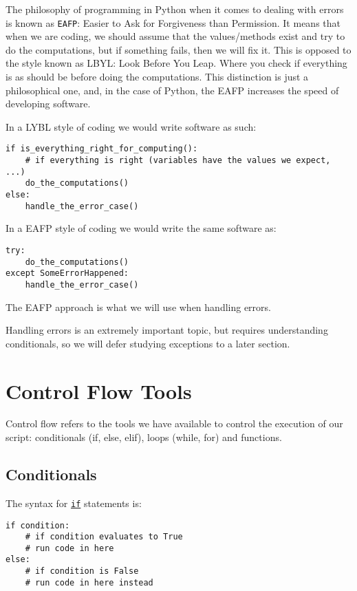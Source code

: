 \documentclass[12pt, a4paper]{article}
\begin{document}
The philosophy of programming in Python when it comes to dealing with errors is known as \texttt{EAFP}: Easier to Ask for Forgiveness than Permission.
It means that when we are coding, we should assume that the values/methods exist and try to do the computations, but if something fails, then we will fix it.
This is opposed to the style known as LBYL: Look Before You Leap.
Where you check if everything is as should be before doing the computations.
This distinction is just a philosophical one, and, in the case of Python, the EAFP increases the speed of developing software.

In a LYBL style of coding we would write software as such:
\lstset{language=jupyter-python,label= ,caption= ,captionpos=b,numbers=none}
\begin{lstlisting}
if is_everything_right_for_computing():
    # if everything is right (variables have the values we expect, ...)
    do_the_computations()
else:
    handle_the_error_case()
\end{lstlisting}

In a EAFP style of coding we would write the same software as:
\lstset{language=jupyter-python,label= ,caption= ,captionpos=b,numbers=none}
\begin{lstlisting}
try:
    do_the_computations()
except SomeErrorHappened:
    handle_the_error_case()
\end{lstlisting}
The EAFP approach is what we will use when handling errors.

Handling errors is an extremely important topic, but requires understanding conditionals, so we will defer studying exceptions to a later section.

\section{Control Flow Tools}
\label{sec:org7795b2b}
Control flow refers to the tools we have available to control the execution of our script: conditionals (if, else, elif), loops (while, for) and functions.
\subsection{Conditionals}
\label{sec:org88bd86c}
The syntax for \href{https://docs.python.org/3.6/tutorial/controlflow.html\#if-statements}{\texttt{if}} statements is:
\lstset{language=jupyter-python,label= ,caption= ,captionpos=b,numbers=none}
\begin{lstlisting}
if condition:
    # if condition evaluates to True
    # run code in here
else:
    # if condition is False
    # run code in here instead
\end{lstlisting}
\end{document}
